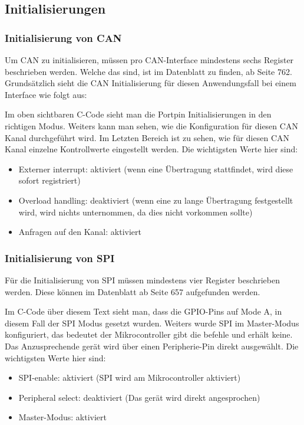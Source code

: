 \documentclass[paper=a4, 12pt]{scrreprt}
\begin{document}
		\subsection{Initialisierungen}\hfill \break
		\subsubsection{Initialisierung von CAN}\hfill \break
		Um CAN zu initialisieren, müssen pro CAN-Interface mindestens sechs Register beschrieben werden.
		Welche das sind, ist im Datenblatt zu finden, ab Seite 762. 
		Grundsätzlich sieht die CAN Initialisierung für diesen Anwendungsfall bei einem Interface wie folgt aus:
		
		Im oben sichtbaren C-Code sieht man die Portpin Initialisierungen in den richtigen Modus. Weiters kann man sehen, wie die Konfiguration für diesen CAN Kanal durchgeführt wird. Im Letzten Bereich ist zu sehen, wie für diesen CAN Kanal einzelne Kontrollwerte eingestellt werden.
		Die wichtigsten Werte hier sind:
		\begin{itemize}
			\item Externer interrupt: aktiviert (wenn eine Übertragung stattfindet, wird diese sofort registriert)
			\item Overload handling: deaktiviert (wenn eine zu lange Übertragung festgestellt wird, wird nichts unternommen, da dies nicht vorkommen sollte)
			\item Anfragen auf den Kanal: aktiviert
		\end{itemize} 
		\newpage
		\subsubsection{Initialisierung von SPI}\hfill \break
		Für die Initialisierung von SPI müssen mindestens vier Register beschrieben werden. Diese können im Datenblatt ab Seite 657 aufgefunden werden.
		
		Im C-Code über diesem Text sieht man, dass die GPIO-Pins auf Mode A, in diesem Fall der SPI Modus gesetzt wurden. Weiters wurde SPI im Master-Modus konfiguriert, das bedeutet der Mikrocontroller gibt die befehle und erhält keine. Das Anzusprechende gerät wird über einen Peripherie-Pin direkt ausgewählt.
		Die wichtigsten Werte hier sind:
		\begin{itemize}
			\item SPI-enable: aktiviert (SPI wird am Mikrocontroller aktiviert)
			\item Peripheral select: deaktiviert (Das gerät wird direkt angesprochen)
			\item Master-Modus: aktiviert
		\end{itemize} \newpage
\end{document}

